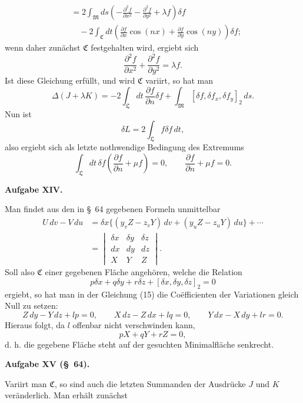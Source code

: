 \documentclass[11pt,a4paper,leqno]{article}
\begin{document}
\[
\begin{aligned}
&=2\int_{\mathfrak{M}}ds
\left(-\frac{\partial^2f}{\partial x^2}
-\frac{\partial^2f}{\partial y^2}+\lambda f\right)\delta f\\
&\quad-2\int_{\mathfrak{C}}dt
\left(\frac{\partial f}{\partial x}\cos(nx)
+\frac{\partial f}{\partial y}\cos(ny)\right)\delta f;
\end{aligned}
\]
wenn daher zunächst $\mathfrak{C}$ festgehalten wird, ergiebt sich
\[
\frac{\partial^2f}{\partial x^2}+\frac{\partial^2f}{\partial y^2}
=\lambda f.
\]
Ist diese Gleichung erfüllt, und wird $\mathfrak{C}$ variirt, so hat man
\[
\Delta(J+\lambda K)
=-2\int_{\mathfrak{L}}dt\,\frac{\partial f}{\partial n}\delta f
+\int_{\mathfrak{M}}[\delta f,\delta f_x,\delta f_y]_2\,ds.
\]
Nun ist
\[
\delta L=2\int_{\mathfrak{L}}f\delta f\,dt,
\]
also ergiebt sich als letzte nothwendige Bedingung des Extremums
\[
\int_{\mathfrak{L}}dt\,\delta f
\left(\frac{\partial f}{\partial n}+\mu f\right)=0,\qquad
\frac{\partial f}{\partial n}+\mu f=0.
\]

\begin{center}
\textbf{Aufgabe XIV.}
\end{center}

Man findet aus den in \S~64 gegebenen Formeln unmittelbar
\[
\begin{aligned}
U\,dv-V\,du
&=\delta x\{(y_vZ-z_vY)\,dv+(y_uZ-z_uY)\,du\}+\cdots\\
&=\begin{vmatrix}
\delta x&\delta y&\delta z\\
dx&dy&dz\\
X&Y&Z
\end{vmatrix}.
\end{aligned}
\]
Soll also $\mathfrak{C}$ einer gegebenen Fläche angehören, welche die Relation
\[
p\delta x+q\delta y+r\delta z+[\delta x,\delta y,\delta z]_2=0
\]
ergiebt, so hat man in der Gleichung (15) die Coëfficienten der Variationen
gleich Null zu setzen:
\[
Z\,dy-Y\,dz+lp=0,\qquad X\,dz-Z\,dx+lq=0,\qquad
Y\,dx-X\,dy+lr=0.
\]
Hieraus folgt, da $l$ offenbar nicht verschwinden kann,
\[
pX+qY+rZ=0,
\]
d. h. die gegebene Fläche steht auf der gesuchten Minimalfläche senkrecht.

\begin{center}
\textbf{Aufgabe XV (\S~64).}
\end{center}

Variirt man $\mathfrak{C}$, so sind auch die letzten Summanden der Ausdrücke
$J$ und $K$ veränderlich. Man erhält zunächst
\end{document}
